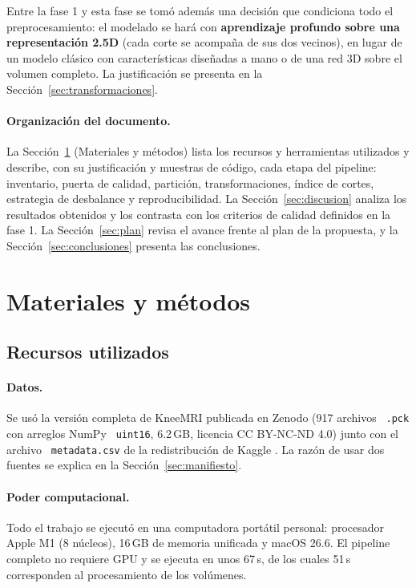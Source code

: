 \documentclass[12pt,letterpaper]{article}
\newcommand{\code}[1]{\texttt{\hyphenchar\font=-1 #1}}
\begin{document}
\noindent Entre la fase 1 y esta fase se tomó además una decisión que condiciona todo el preprocesamiento: el modelado se hará con \textbf{aprendizaje profundo sobre una representación 2.5D} (cada corte se acompaña de sus dos vecinos), en lugar de un modelo clásico con características diseñadas a mano o de una red 3D sobre el volumen completo. La justificación se presenta en la Sección~\ref{sec:transformaciones}.

\paragraph{Organización del documento.} La Sección~\ref{sec:metodos} (Materiales y métodos) lista los recursos y herramientas utilizados y describe, con su justificación y muestras de código, cada etapa del pipeline: inventario, puerta de calidad, partición, transformaciones, índice de cortes, estrategia de desbalance y reproducibilidad. La Sección~\ref{sec:discusion} analiza los resultados obtenidos y los contrasta con los criterios de calidad definidos en la fase 1. La Sección~\ref{sec:plan} revisa el avance frente al plan de la propuesta, y la Sección~\ref{sec:conclusiones} presenta las conclusiones.

\section{Materiales y métodos}\label{sec:metodos}

\subsection{Recursos utilizados}

\paragraph{Datos.} Se usó la versión completa de KneeMRI publicada en Zenodo \cite{zenodo_kneemri} (917 archivos \code{.pck} con arreglos NumPy \code{uint16}, 6.2\,GB, licencia CC BY-NC-ND 4.0) junto con el archivo \code{metadata.csv} de la redistribución de Kaggle \cite{kaggle_kneemri}. La razón de usar dos fuentes se explica en la Sección~\ref{sec:manifiesto}.

\paragraph{Poder computacional.} Todo el trabajo se ejecutó en una computadora portátil personal: procesador Apple M1 (8 núcleos), 16\,GB de memoria unificada y macOS 26.6. El pipeline completo no requiere GPU y se ejecuta en unos 67\,s, de los cuales 51\,s corresponden al procesamiento de los volúmenes.
\end{document}
